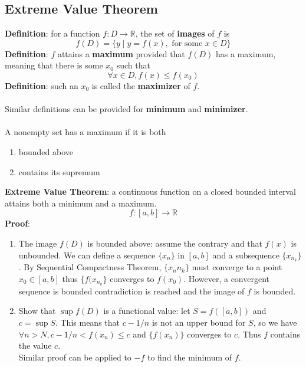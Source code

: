 \documentclass{article}
\begin{document}
  \subsection{Extreme Value Theorem}
  \textbf{Definition}: for a function $f \colon D \rightarrow \mathbb{R}$, the set of \textbf{images} of $f$ is
  \[f(D) = \{ y \mid y = f(x), \text{ for some } x \in D\}\]
  \textbf{Definition}: $f$ attains a \textbf{maximum} provided that $f(D)$ has a maximum, meaning that there is some $x_0$ such that
  \[\forall x \in D, f(x) \leq f(x_0)\]
  \textbf{Definition}: such an $x_0$ is called the \textbf{maximizer} of $f$. \\ \\
  Similar definitions can be provided for \textbf{minimum} and \textbf{minimizer}. \\ \\
  A nonempty set has a maximum if it is both
  \begin{enumerate}
    \item bounded above 
    \item contains its supremum
  \end{enumerate}
  \textbf{Extreme Value Theorem}: a continuous function on a closed bounded interval attains both a minimum and a maximum.
  \[f \colon [a,b] \rightarrow \mathbb{R}\]
  \textbf{Proof}:
  \begin{enumerate}
    \item The image $f(D)$ is bounded above: assume the contrary and that $f(x)$ is unbounded. We can define a sequence $\{x_n\}$ in $[a,b]$ and a subsequence $\{x_{n_k}\}$. By Sequential Compactness Theorem, $\{x_n{n_k}\}$ must converge to a point $x_0 \in [a,b]$ thus $\{f(x_{n_k}\}$ converges to $f(x_0)$. However, a convergent sequence is bounded contradiction is reached and the image of $f$ is bounded.
    \item Show that $\sup{f(D)}$ is a functional value: let $S = f([a,b])$ and $c = \sup{S}$. This means that $c- 1/n$ is not an upper bound for $S$, so we have $\forall n > N, c- 1/n < f(x_n) \leq c$ and $\{f(x_n)\}$ converges to $c$. Thus $f$ contains the value $c$. \\
    Similar proof can be applied to $-f$ to find the minimum of $f$.
  \end{enumerate}
\end{document}
